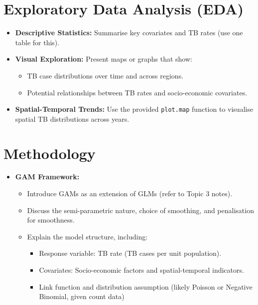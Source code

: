 \documentclass[
  11pt,
  a4paper,11pt]{article}
\providecommand{\tightlist}{%
  \setlength{\itemsep}{0pt}\setlength{\parskip}{0pt}}
\begin{document}
\section{Exploratory Data Analysis
(EDA)}\label{exploratory-data-analysis-eda}

\begin{itemize}
\tightlist
\item
  \textbf{Descriptive Statistics:} Summarise key covariates and TB rates
  (use one table for this).
\end{itemize}

\begin{itemize}
\item
  \textbf{Visual Exploration:} Present maps or graphs that show:

  \begin{itemize}
  \item
    TB case distributions over time and across regions.
  \item
    Potential relationships between TB rates and socio-economic
    covariates.
  \end{itemize}
\end{itemize}

\begin{itemize}
\tightlist
\item
  \textbf{Spatial-Temporal Trends:} Use the provided \texttt{plot.map}
  function to visualise spatial TB distributions across years.
\end{itemize}

\section{Methodology}\label{methodology}

\begin{itemize}
\item
  \textbf{GAM Framework:}

  \begin{itemize}
  \item
    Introduce GAMs as an extension of GLMs (refer to Topic 3 notes).
  \item
    Discuss the semi-parametric nature, choice of smoothing, and
    penalisation for smoothness.
  \item
    Explain the model structure, including:

    \begin{itemize}
    \item
      Response variable: TB rate (TB cases per unit population).
    \item
      Covariates: Socio-economic factors and spatial-temporal
      indicators.
    \item
      Link function and distribution assumption (likely Poisson or
      Negative Binomial, given count data)
    \end{itemize}
  \end{itemize}
\end{itemize}
\end{document}
